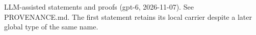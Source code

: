 \documentclass[11pt]{article}
\begin{document}

\bigskip
{\footnotesize LLM-assisted statements and proofs (gpt-6, 2026-11-07).
See PROVENANCE.md. The first statement retains its local carrier despite a later global type of the same name.}
\end{document}
